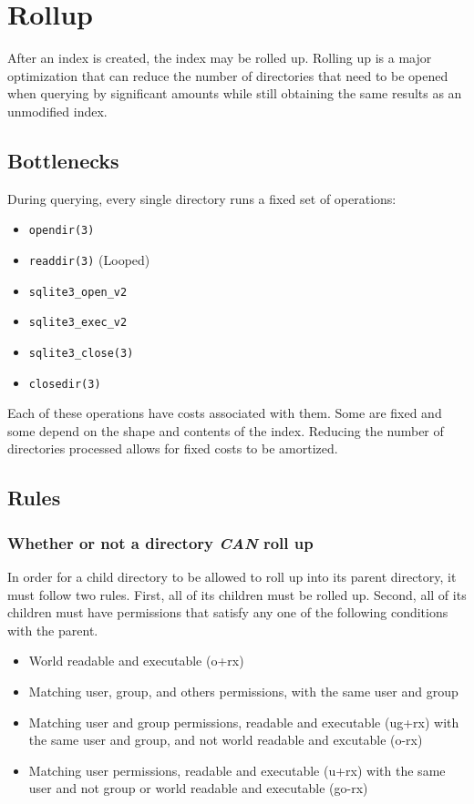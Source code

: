 \section{Rollup}
\label{sec:rollup}
After an index is created, the index may be rolled up. Rolling up is a
major optimization that can reduce the number of directories that need
to be opened when querying by significant amounts while still
obtaining the same results as an unmodified index.

\subsection{Bottlenecks}
During querying, every single directory runs a fixed set of
operations:

\begin{itemize}
  \item \texttt{opendir(3)}
  \item \texttt{readdir(3)} (Looped)
  \item \texttt{sqlite3\_open\_v2}
  \item \texttt{sqlite3\_exec\_v2}
  \item \texttt{sqlite3\_close(3)}
  \item \texttt{closedir(3)}
\end{itemize}

Each of these operations have costs associated with them. Some are
fixed and some depend on the shape and contents of the index. Reducing
the number of directories processed allows for fixed costs to be
amortized.

\subsection{Rules}
\label{rolluprules}
\subsubsection{Whether or not a directory {\it CAN} roll up}
In order for a child directory to be allowed to roll up into its
parent directory, it must follow two rules. First, all of its children
must be rolled up. Second, all of its children must have permissions
that satisfy any one of the following conditions with the parent.

\begin{itemize}
  \item World readable and executable (o+rx)
  \item Matching user, group, and others permissions, with the same
    user and group
  \item Matching user and group permissions, readable and executable
    (ug+rx) with the same user and group, and not world readable and
    excutable (o-rx)
  \item Matching user permissions, readable and executable (u+rx) with
    the same user and not group or world readable and executable
    (go-rx)
\end{itemize}

